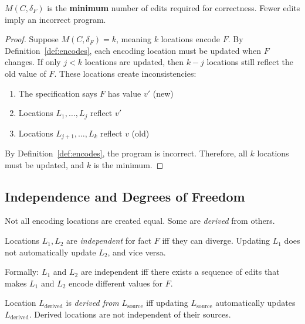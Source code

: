 \begin{theorem}\label{thm:correctness-forcing}
$M(C, \delta_F)$ is the \textbf{minimum} number of edits required for correctness. Fewer edits imply an incorrect program.
\end{theorem}

\begin{proof}
Suppose $M(C, \delta_F) = k$, meaning $k$ locations encode $F$. By Definition~\ref{def:encodes}, each encoding location must be updated when $F$ changes. If only $j < k$ locations are updated, then $k - j$ locations still reflect the old value of $F$. These locations create inconsistencies:

\begin{enumerate}
\tightlist
\item The specification says $F$ has value $v'$ (new)
\item Locations $L_1, \ldots, L_j$ reflect $v'$
\item Locations $L_{j+1}, \ldots, L_k$ reflect $v$ (old)
\end{enumerate}

By Definition~\ref{def:encodes}, the program is incorrect. Therefore, all $k$ locations must be updated, and $k$ is the minimum.
\end{proof}

\subsection{Independence and Degrees of Freedom}\label{sec:dof}

Not all encoding locations are created equal. Some are \emph{derived} from others.

\begin{definition}\label{def:independent}
Locations $L_1, L_2$ are \emph{independent} for fact $F$ iff they can diverge. Updating $L_1$ does not automatically update $L_2$, and vice versa.

Formally: $L_1$ and $L_2$ are independent iff there exists a sequence of edits that makes $L_1$ and $L_2$ encode different values for $F$.
\end{definition}

\begin{definition}\label{def:derived}
Location $L_{\text{derived}}$ is \emph{derived from} $L_{\text{source}}$ iff updating $L_{\text{source}}$ automatically updates $L_{\text{derived}}$. Derived locations are not independent of their sources.
\end{definition}

